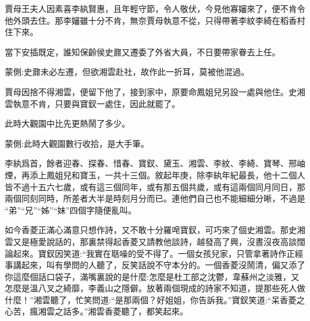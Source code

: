 \begin{parag}
    賈母王夫人因素喜李紈賢惠，且年輕守節，令人敬伏，今見他寡嬸來了，便不肯令他外頭去住。那李嬸雖十分不肯，無奈賈母執意不從，只得帶著李紋李綺在稻香村住下來。
\end{parag}


\begin{parag}
    當下安插既定，誰知保齡侯史鼐又遷委了外省大員，不日要帶家眷去上任。\begin{note}蒙側:史鼐未必左遷，但欲湘雲赴社，故作此一折耳，莫被他混過。\end{note}賈母因捨不得湘雲，便留下他了，接到家中，原要命鳳姐兒另設一處與他住。史湘雲執意不肯，只要與寶釵一處住，因此就罷了。
\end{parag}


\begin{parag}
    此時大觀園中比先更熱鬧了多少。\begin{note}蒙側:此時大觀園數行收拾，是大手筆。\end{note}李紈爲首，餘者迎春、探春、惜春、寶釵、黛玉、湘雲、李紋、李綺、寶琴、邢岫煙，再添上鳳姐兒和寶玉，一共十三個。敘起年庚，除李紈年紀最長，他十二個人皆不過十五六七歲，或有這三個同年，或有那五個共歲，或有這兩個同月同日，那兩個同刻同時，所差者大半是時刻月分而已。連他們自己也不能細細分晰，不過是 “弟”“兄”“姊”“妹”四個字隨便亂叫。
\end{parag}


\begin{parag}
    如今香菱正滿心滿意只想作詩，又不敢十分羅唣寶釵，可巧來了個史湘雲。那史湘雲又是極愛說話的，那裏禁得起香菱又請教他談詩，越發高了興，沒晝沒夜高談闊論起來。寶釵因笑道:“我實在聒噪的受不得了。一個女孩兒家，只管拿著詩作正經事講起來，叫有學問的人聽了，反笑話說不守本分的。一個香菱沒鬧清，偏又添了你這麼個話口袋子，滿嘴裏說的是什麼:怎麼是杜工部之沈鬱，韋蘇州之淡雅，又怎麼是溫八叉之綺靡，李義山之隱僻。放著兩個現成的詩家不知道，提那些死人做什麼！”湘雲聽了，忙笑問道:“是那兩個？好姐姐，你告訴我。”寶釵笑道:“呆香菱之心苦，瘋湘雲之話多。”湘雲香菱聽了，都笑起來。
\end{parag}


